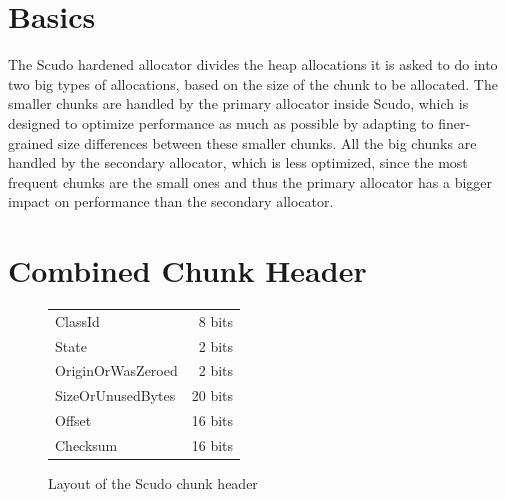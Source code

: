 \documentclass[a4paper,11pt,oneside]{report}
\begin{document}
\section{Basics}

The Scudo hardened allocator divides the heap allocations it is asked to do into two big
types of allocations, based on the size of the chunk to be allocated.  The smaller chunks
are handled by the primary allocator inside Scudo, which is designed to optimize
performance as much as possible by adapting to finer-grained size differences between
these smaller chunks. All the big chunks are handled by the secondary allocator, which is
less optimized, since the most frequent chunks are the small ones and thus the primary
allocator has a bigger impact on performance than the secondary allocator.

\section{Combined Chunk Header}

\begin{figure}[h]
  \centering
  \begin{tabular}{l r}
    \toprule
    ClassId & 8 bits \\
    State & 2 bits \\
    OriginOrWasZeroed & 2 bits \\
    SizeOrUnusedBytes & 20 bits \\
    Offset & 16 bits \\
    Checksum & 16 bits \\
    \bottomrule
  \end{tabular}
  \caption{Layout of the Scudo chunk header}\label{fig:ScudoChunkHeader}
\end{figure}
\end{document}
